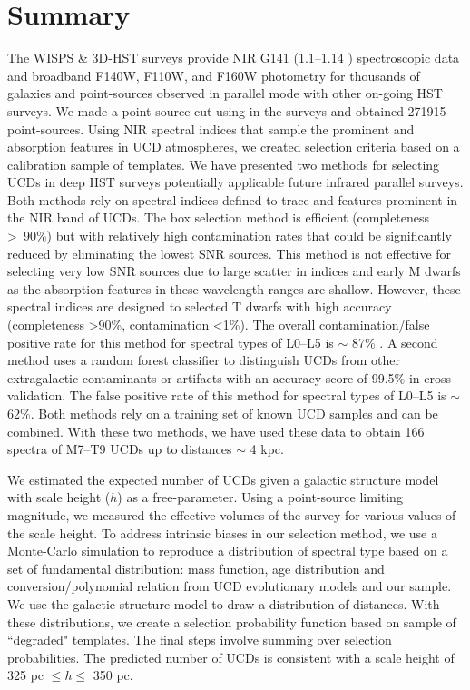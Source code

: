 \documentclass[manuscript]{aastex63}
\begin{document}
\section{Summary\label{sec:summary}}
The WISPS \& 3D-HST surveys provide NIR G141 (1.1--1.14 \micron) spectroscopic data and broadband F140W, F110W, and F160W photometry for thousands of galaxies and point-sources observed in parallel mode with other on-going HST surveys. We made a point-source cut using in the surveys and obtained 271915 point-sources. Using NIR spectral indices that sample the prominent \wat and \meth absorption features in UCD atmospheres, we created selection criteria based on a calibration sample of templates. We have presented two methods for selecting UCDs in deep HST surveys potentially applicable future infrared parallel surveys. Both methods rely on spectral indices defined to trace \wat and \meth features prominent in the NIR band of UCDs. The box selection method is efficient (completeness \textgreater\ 90\%) but with relatively high contamination rates that could be significantly reduced by eliminating the lowest SNR sources. This method is not effective for selecting very low SNR sources due to large scatter in indices and early M dwarfs as the absorption features in these wavelength ranges are shallow. However, these spectral indices are designed to selected T dwarfs with high accuracy (completeness \textgreater 90\%, contamination \textless 1\%). The overall contamination/false positive rate for this method for spectral types of L0--L5 is $\sim$ 87\% . A second method uses a random forest classifier to distinguish UCDs from other extragalactic contaminants or artifacts with an accuracy score of 99.5\% in cross-validation. The false positive rate of this method  for spectral types of L0--L5 is $\sim$62\%. Both methods rely on a training set of known UCD samples and can be combined. With these two methods, we have used these data to obtain 166 spectra of M7--T9 UCDs up to distances $\sim$ 4 kpc. 

We estimated the expected number of UCDs given a galactic structure model with scale height ($h$) as a free-parameter. Using a point-source limiting magnitude, we measured the effective volumes of the survey for various values of the scale height. To address intrinsic biases in our selection method, we use a Monte-Carlo simulation to reproduce a distribution of spectral type based on a set of fundamental distribution: mass function, age distribution and conversion/polynomial relation from UCD evolutionary models and our sample. We use the galactic structure model to draw a distribution of distances. With these distributions, we create a selection probability function based on sample of ``degraded" templates. The final steps involve summing over selection probabilities. The predicted number of UCDs is consistent with a scale height of 325 pc $\leq h \leq$ 350 pc.  
\end{document}

